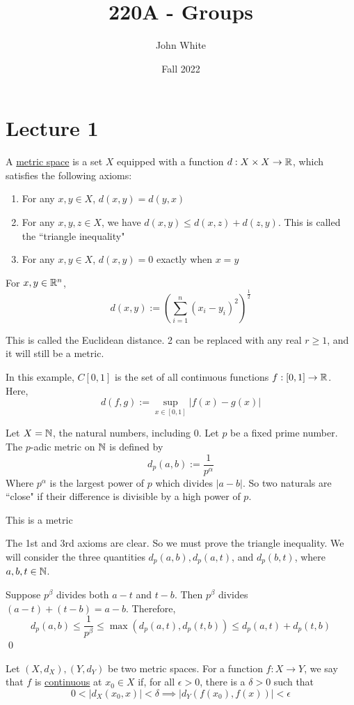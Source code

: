 \documentclass[x11names,reqno,14pt]{extarticle}
\title{220A - Groups}
\author{John White}
\date{Fall 2022}
\begin{document}
\section*{Lecture 1}


A \underline{metric space} is a set $X$ equipped with a function $d:X\times X \to \mathbb{R}$, which satisfies the following axioms:
\begin{enumerate}
	\item For any $x, y \in X$, $d(x, y) = d(y, x)$
	\item For any $x, y, z \in X$, we have $d(x, y) \leq d(x, z) + d(z, y)$. This is called the ``triangle inequality"
	\item For any $x, y \in X$, $d(x, y) = 0$ exactly when $x = y$

\end{enumerate}

\exm

For $x, y \in \mathbb{R}^n$, 
\[
d(x, y) := \left(\sum_{i=1}^n(x_i - y_i)^2\right)^{\frac{1}{2}}
\]

This is called the Euclidean distance. 2 can be replaced with any real $r \geq 1$, and it will still be a metric. 

\exm 

In this example, $C[0, 1]$ is the set of all continuous functions $f:[0, 1]\to\mathbb{R}$. Here, 
\[
d(f, g) := \sup_{x\in[0,1]}|f(x)- g(x)|
\]

\exm

Let $X = \mathbb{N}$, the natural numbers, including $0$. Let $p$ be a fixed prime number. The $p$-adic metric on $\mathbb{N}$ is defined by 
\[
d_p(a, b) := \frac{1}{p^\alpha} 
\]
Where $p^\alpha$ is the largest power of $p$ which divides $|a - b|$. So two naturals are ``close" if their difference is divisible by a high power of $p$. 

\claim This is a metric

\proof
The 1st and 3rd axioms are clear. So we must prove the triangle inequality. We will consider the three quantities $d_p(a, b), d_p(a, t)$, and $d_p(b, t)$, where $a, b, t \in \mathbb{N}$. 

Suppose $p^\beta$ divides both $a - t$ and $t - b$. Then $p^\beta$ divides $(a - t) + (t - b) = a - b$. Therefore, 
\[
d_p(a, b) \leq \frac{1}{p^\beta} \leq \max(d_p(a, t), d_p(t, b)) \leq d_p(a, t) + d_p(t, b)
\]
\qed


Let $(X, d_X), (Y, d_Y)$ be two metric spaces. For a function $f:X\to Y$, we say that $f$ is \underline{continuous} at $x_0 \in X$ if, for all $\epsilon > 0$, there is a $\delta > 0$ such that 
\[
0 < |d_X(x_0, x)| < \delta \implies |d_Y(f(x_0), f(x))| < \epsilon
\]
\end{document}
